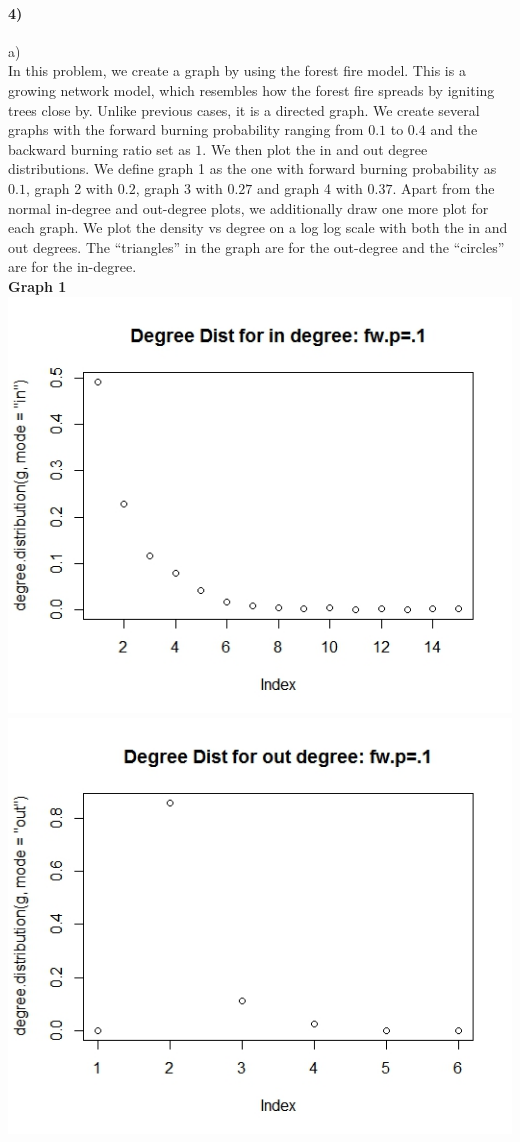 \documentclass{article}
\begin{document}
\paragraph{4)}
a)\\
In this problem, we create a graph by using the forest fire model.
This is a growing network model, which resembles how the
forest fire spreads by igniting trees close by. Unlike previous cases, it is a directed graph.
We create several graphs with the forward burning probability ranging from $0.1$ to $0.4$
and the backward burning ratio set as $1$.
We then plot the in and out degree distributions. We define graph 1 as the one with forward burning probability 
as $0.1$, graph 2 with $0.2$, graph 3 with $0.27$ and graph 4 with $0.37$. Apart from the normal in-degree and out-degree plots,
we additionally draw one more plot for each graph. We plot the density vs degree on a log log scale with both the in and out 
degrees. The ``triangles'' in the graph are for the out-degree and the ``circles'' are for the in-degree.\\
\textbf{Graph 1}\\
\includegraphics[scale=0.4]{pd1} \\
\includegraphics[scale=0.4]{pd2} \\
\end{document}
